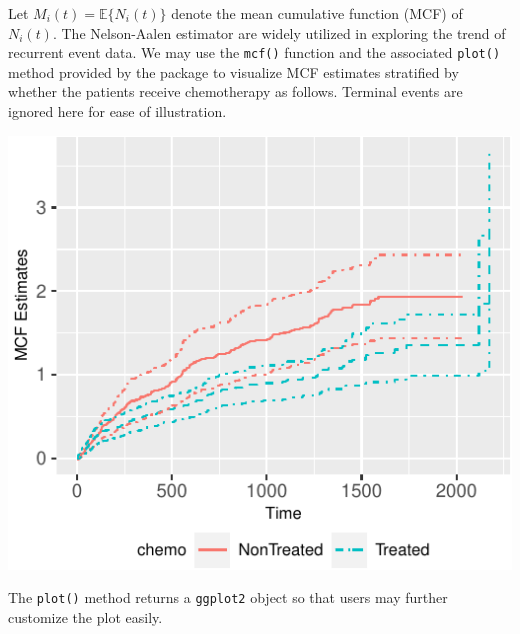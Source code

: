 Let \(M_i(t)=\mathbb{E}\{N_i(t)\}\) denote the mean cumulative function
(MCF) of \(N_i(t)\). The Nelson-Aalen estimator \citep{nelson2003siam}
are widely utilized in exploring the trend of recurrent event data. We
may use the \texttt{mcf()} function and the associated \texttt{plot()}
method provided by the  package to visualize MCF estimates
stratified by whether the patients receive chemotherapy as follows.
Terminal events are ignored here for ease of illustration.

\begin{Shaded}
\begin{Highlighting}[]
\StringTok{ }\NormalTok{(}\OperatorTok{\textasciitilde{}}\StringTok{ }
 \NormalTok{, } \OperatorTok{:}\NormalTok{) }\OperatorTok{+}
\StringTok{    }\OperatorTok{::}\NormalTok{(} \NormalTok{)}
\end{Highlighting}
\end{Shaded}

\includegraphics{reda-mcf_files/figure-latex/plot-sampleMcf-1.pdf}

The \texttt{plot()} method returns a \texttt{ggplot2} object
\citep{hadley2016ggplot2} so that users may further customize the plot
easily.

